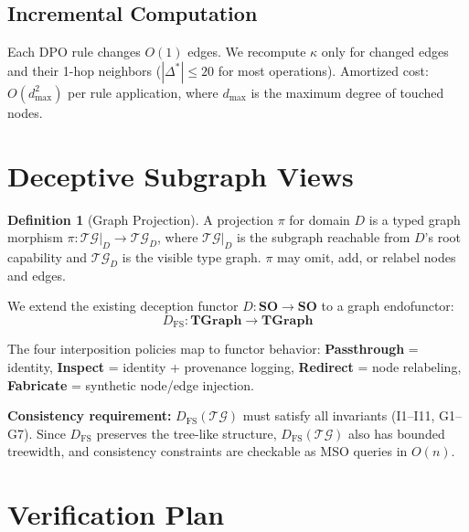 \documentclass[11pt,a4paper]{article}
\theoremstyle{definition}
\newtheorem{definition}{Definition}[section]
\newcommand{\TG}{\ensuremath{\mathcal{TG}}}
\begin{document}
\subsection{Incremental Computation}

Each DPO rule changes $O(1)$ edges. We recompute $\kappa$ only for changed
edges and their 1-hop neighbors ($|\Delta^*| \le 20$ for most operations).
Amortized cost: $O(d_{\max}^2)$ per rule application, where $d_{\max}$ is
the maximum degree of touched nodes.

\section{Deceptive Subgraph Views}\label{sec:deception}

\begin{definition}[Graph Projection]\label{def:projection}
A projection $\pi$ for domain $D$ is a typed graph morphism
$\pi\colon \TG|_D \to \TG_D$, where $\TG|_D$ is the subgraph reachable
from $D$'s root capability and $\TG_D$ is the visible type graph.
$\pi$ may omit, add, or relabel nodes and edges.
\end{definition}

We extend the existing deception functor $D\colon \mathbf{SO} \to
\mathbf{SO}$ to a graph endofunctor:
\[
  D_{\mathrm{FS}}\colon \mathbf{TGraph} \to \mathbf{TGraph}
\]

The four interposition policies map to functor behavior:
\textbf{Passthrough} = identity, \textbf{Inspect} = identity + provenance
logging, \textbf{Redirect} = node relabeling, \textbf{Fabricate} =
synthetic node/edge injection.

\textbf{Consistency requirement:} $D_{\mathrm{FS}}(\TG)$ must satisfy all
invariants (I1--I11, G1--G7). Since $D_{\mathrm{FS}}$ preserves the
tree-like structure, $D_{\mathrm{FS}}(\TG)$ also has bounded treewidth,
and consistency constraints are checkable as MSO queries in $O(n)$.

\section{Verification Plan}\label{sec:verification}
\end{document}
